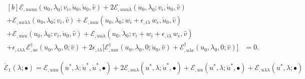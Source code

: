 \documentclass[12pt, final]{scrartcl}
\theoremstyle{definition}
\newcommand{\E}{\mathcal E}
\newcommand{\EE}{\mathcal E ^ \dagger}
\begin{document}
\begin{equation}
  \label{eq:20221116152647}
  \begin{aligned}[b]
    \E_{,uuuu}(u_0, \lambda_0; v_i, \dot{u}_0, \dot{u}_0, \hat{v}) + 2\E_{,uuu\lambda}(u_0, \lambda_0; v_i, \dot{u}_0, \hat{v}) &\\
    + \E_{,uu\lambda\lambda}(u_0, \lambda_0; v_i, \hat{v}) + \E_{,uuu}(u_0, \lambda_0; w_i + \epsilon_{,i\lambda} \, w_{\epsilon}, \dot{u}_0, \hat{v}) &\\
    + \E_{,uuu}(u_0, \lambda_0; v_i, \ddot{u}_0, \hat{v}) + \E_{,uu\lambda}(u_0, \lambda_0; v_i + w_{i} + \epsilon_{,i\lambda} \, w_{\epsilon}, \hat{v}) &\\
    + \epsilon_{,i\lambda\lambda} \, \EE_{,u\epsilon}(u_0, \lambda_0, 0; \hat{v}) + 2\epsilon_{,i\lambda} \bigl[ \EE_{,uu\epsilon}(u_0, \lambda_0, 0; \dot{u}_0, \hat{v}) + \EE_{,u\lambda\epsilon}(u_0, \lambda_0, 0; \hat{v}) \bigr] &= 0.
  \end{aligned}
\end{equation}

\begin{equation*}
  \ddot{\E}_1(\lambda; \bullet) = \E_{,uuu}(u^\ast, \lambda; \dot{u}^\ast, \dot{u}^\ast, \bullet) + 2\E_{,uu\lambda}(u^\ast, \lambda; \dot{u}^\ast, \bullet) + \E_{,uu}(u^\ast, \lambda; \ddot{u}^\ast, \bullet) + \E_{,u\lambda\lambda}(u^\ast, \lambda; \bullet)
\end{equation*}
\end{document}
